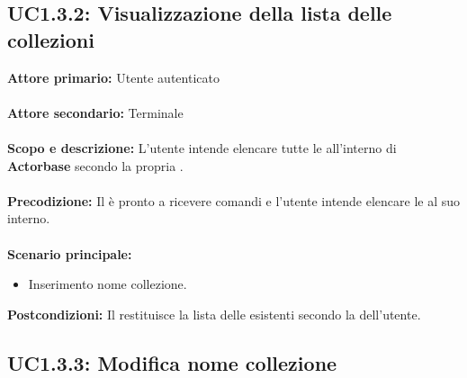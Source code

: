 \documentclass{scalatekids-article}
\begin{document}
\subsection{UC1.3.2: Visualizzazione della lista delle collezioni}

\textbf{Attore primario:} Utente autenticato\\ \\
\textbf{Attore secondario:} Terminale\\ \\
\textbf{Scopo e descrizione:} L'utente intende elencare tutte le  all'interno di \textbf{Actorbase} secondo la propria .\\ \\
\textbf{Precodizione:} Il  è pronto a ricevere comandi e l'utente intende elencare le  al suo interno.\\ \\
\textbf{Scenario principale:}
\begin{itemize}
\item Inserimento nome collezione.
\end{itemize}
\textbf{Postcondizioni:} Il  restituisce la lista delle  esistenti secondo la  dell'utente.

\subsection{UC1.3.3: Modifica nome collezione}
\end{document}
